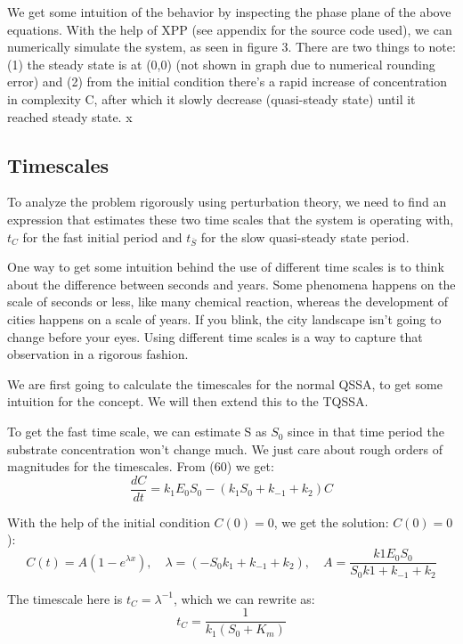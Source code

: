 \documentclass[12pt]{article}
\begin{document}
We get some intuition of the behavior by inspecting the phase plane of
the above equations. With the help of XPP (see appendix for the source
code used), we can numerically simulate the system, as seen in figure
3. There are two things to note: (1) the steady state is at (0,0) (not
shown in graph due to numerical rounding error) and (2) from the initial
condition there's a rapid increase of concentration in complexity C,
after which it slowly decrease (quasi-steady state) until it reached
steady state.
x
\subsection{Timescales}

To analyze the problem rigorously using perturbation theory, we need
to find an expression that estimates these two time scales that the
system is operating with, $t_C$ for the fast initial period and
$t_{\overline{S}}$ for the slow quasi-steady state period.

One way to get some intuition behind the use of different time scales
is to think about the difference between seconds and years. Some
phenomena happens on the scale of seconds or less, like many chemical
reaction, whereas the development of cities happens on a scale of
years. If you blink, the city landscape isn't going to change before
your eyes. Using different time scales is a way to capture that
observation in a rigorous fashion.

We are first going to calculate the timescales for the normal QSSA, to
get some intuition for the concept. We will then extend this to the
TQSSA.

To get the fast time scale, we can estimate S as $S_0$ since in that
time period the substrate concentration won't change much. We just
care about rough orders of magnitudes for the timescales. From (60) we
get:
\begin{equation}
  \frac{dC}{dt} = k_1E_0 S_0 - (k_1 S_0 + k_{-1} + k_2)C
\end{equation}

With the help of the initial condition $C(0)=0$, we get the solution:
$C(0)=0$):
\begin{equation}
  C(t) = A(1 -  e^{\lambda x}), \quad
  \lambda = (-S_0 k_1 + k_{-1} + k_2), \quad
  A =\frac{k1 E_0 S_0}{S_0 k1 + k_{-1} + k_2}
\end{equation}

The timescale here is $t_C = \lambda^{-1}$, which we can rewrite as:
\begin{equation}
  t_C = \frac{1}{k_1(S_0+K_m)}
\end{equation}
\end{document}
